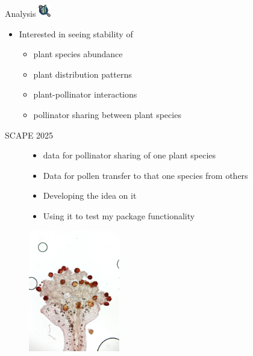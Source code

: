 \documentclass[
  ignorenonframetext,
  aspectratio=169,
]{beamer}
\begin{document}
\begin{frame}{}
\begin{block}{Analysis
\includegraphics[width=0.20833in,height=\textheight,keepaspectratio]{images/clipboard-229370691.png}}
\label{analysis-1}
\begin{itemize}
\item
  Interested in seeing stability of

  \begin{itemize}
  \item
    plant species abundance
  \item
    plant distribution patterns
  \item
    plant-pollinator interactions
  \item
    pollinator sharing between plant species
  \end{itemize}
\end{itemize}
\end{block}

\begin{block}{SCAPE 2025}
\label{scape-2025}
\begin{figure}

\begin{minipage}{0.50\linewidth}

\begin{itemize}
\item
  data for pollinator sharing of one plant species
\item
  Data for pollen transfer to that one species from others
\item
  Developing the idea on it
\item
  Using it to test my package functionality
\end{itemize}

\end{minipage}%
%
\begin{minipage}{0.50\linewidth}
\begin{center}
\includegraphics[width=1.5625in,height=\textheight,keepaspectratio]{images/Blizna_Suc_pra_2.jpg}
\end{center}
\end{minipage}%

\end{figure}%
\end{block}
\end{frame}
\end{document}
